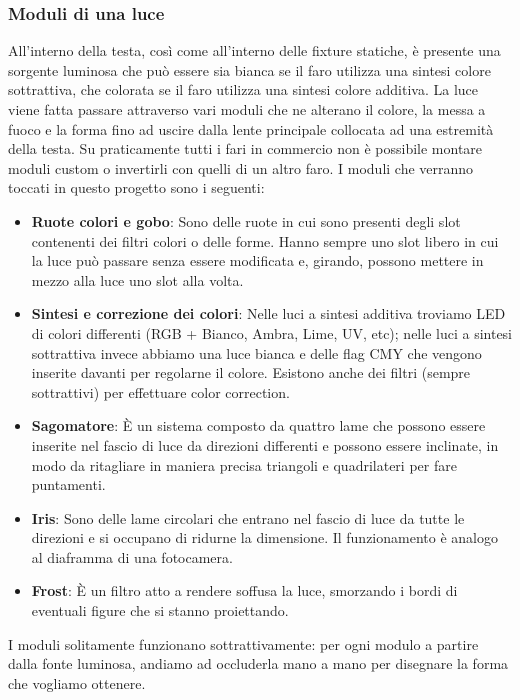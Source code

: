 \documentclass[main.tex]{subfiles}
\begin{document}
\subsubsection{Moduli di una luce}\label{subsec:1_1_modules}
All'interno della testa, così come all'interno delle fixture statiche, è presente una sorgente luminosa che può essere sia bianca se il faro utilizza una sintesi colore sottrattiva, che colorata se il faro utilizza una sintesi colore additiva. La luce viene fatta passare attraverso vari moduli che ne alterano il colore, la messa a fuoco e la forma fino ad uscire dalla lente principale collocata ad una estremità della testa. Su praticamente tutti i fari in commercio non è possibile montare moduli custom o invertirli con quelli di un altro faro. \newline
I moduli che verranno toccati in questo progetto sono i seguenti:
\begin{itemize}
    \item \textbf{Ruote colori e gobo}: Sono delle ruote in cui sono presenti degli slot contenenti dei filtri colori o delle forme. Hanno sempre uno slot libero in cui la luce può passare senza essere modificata e, girando, possono mettere in mezzo alla luce uno slot alla volta.
    \item \textbf{Sintesi e correzione dei colori}: Nelle luci a sintesi additiva troviamo LED di colori differenti (RGB + Bianco, Ambra, Lime, UV, etc); nelle luci a sintesi sottrattiva invece abbiamo una luce bianca e delle flag CMY che vengono inserite davanti per regolarne il colore. Esistono anche dei filtri (sempre sottrattivi) per effettuare color correction.
    \item \textbf{Sagomatore}: È un sistema composto da quattro lame che possono essere inserite nel fascio di luce da direzioni differenti e possono essere inclinate, in modo da ritagliare in maniera precisa triangoli e quadrilateri per fare puntamenti.
    \item \textbf{Iris}: Sono delle lame circolari che entrano nel fascio di luce da tutte le direzioni e si occupano di ridurne la dimensione. Il funzionamento è analogo al diaframma di una fotocamera.
    \item \textbf{Frost}: È un filtro atto a rendere soffusa la luce, smorzando i bordi di eventuali figure che si stanno proiettando.
\end{itemize}
I moduli solitamente funzionano sottrattivamente: per ogni modulo a partire dalla fonte luminosa, andiamo ad occluderla mano a mano per disegnare la forma che vogliamo ottenere.
\end{document}

